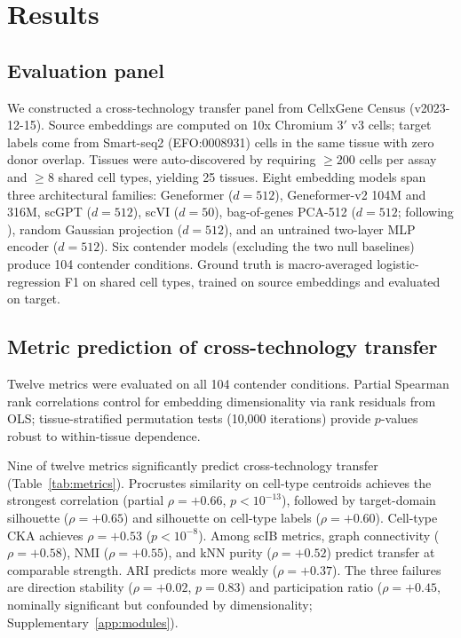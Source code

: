 \documentclass[11pt]{article}
\begin{document}
\section{Results}

\subsection{Evaluation panel}
\label{sec:panel}

We constructed a cross-technology transfer panel from CellxGene Census
(v2023-12-15). Source embeddings are computed on 10x Chromium 3$'$ v3
cells; target labels come from Smart-seq2 (EFO:0008931) cells in the
same tissue with zero donor overlap. Tissues were auto-discovered by
requiring $\geq 200$ cells per assay and $\geq 8$ shared cell types,
yielding 25 tissues. Eight embedding models
span three architectural families: Geneformer \citep{theodoris2023geneformer}
($d = 512$), Geneformer-v2 104M and 316M, scGPT \citep{cui2024scgpt}
($d = 512$), scVI \citep{lopez2018scvi} ($d = 50$), bag-of-genes
PCA-512 ($d = 512$; following \citealp{cole2026morpheus}), random
Gaussian projection ($d = 512$), and an untrained two-layer MLP encoder
($d = 512$). Six contender models (excluding the two null baselines)
produce 104 contender conditions. Ground truth is macro-averaged
logistic-regression F1 on shared cell types, trained on source
embeddings and evaluated on target.


\subsection{Metric prediction of cross-technology transfer}
\label{sec:prediction}

Twelve metrics were evaluated on all 104 contender conditions. Partial
Spearman rank correlations control for embedding dimensionality via rank
residuals from OLS; tissue-stratified permutation tests (10,000
iterations) provide $p$-values robust to within-tissue dependence.

Nine of twelve metrics significantly predict cross-technology transfer
(Table~\ref{tab:metrics}). Procrustes similarity on cell-type centroids
achieves the strongest correlation (partial $\rho = +0.66$,
$p < 10^{-13}$), followed by target-domain silhouette ($\rho = +0.65$)
and silhouette on cell-type labels ($\rho = +0.60$). Cell-type CKA
achieves $\rho = +0.53$ ($p < 10^{-8}$). Among scIB metrics, graph
connectivity ($\rho = +0.58$), NMI ($\rho = +0.55$), and kNN purity
($\rho = +0.52$) predict transfer at comparable strength. ARI predicts
more weakly ($\rho = +0.37$). The three failures are
direction stability ($\rho = +0.02$, $p = 0.83$) and
participation ratio ($\rho = +0.45$, nominally significant but
confounded by dimensionality; Supplementary~\ref{app:modules}).
\end{document}
